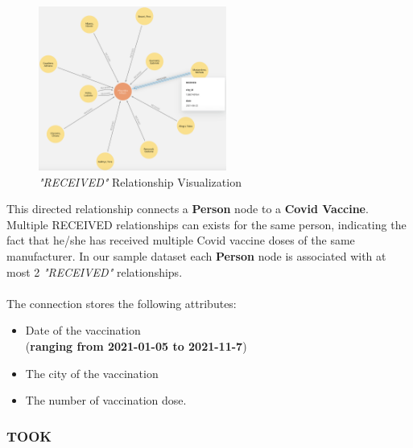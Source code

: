 \documentclass{article}[IEEEtran]
\begin{document}
\begin{figure}
\vspace{-1.5cm}
\begin{center}
\includegraphics[width=0.55\textwidth, frame]{RECEIVED.png}
\caption{\emph{"RECEIVED"} Relationship Visualization}
\end{center}
\end{figure}
This directed relationship connects a \textbf{Person} node to a \textbf{Covid Vaccine}. Multiple RECEIVED relationships  can exists for the same person, indicating the fact that he/she has received multiple Covid vaccine doses of the same manufacturer. In our sample dataset each \textbf{Person} node is associated with  at most 2 \emph{"RECEIVED"} relationships.
\\\\
The connection stores the following attributes:
\begin{itemize}
    \item Date of the vaccination \\ (\textbf{ranging from 2021-01-05 to 2021-11-7})
    \item The city of the vaccination
    \item The number of vaccination dose.
\end{itemize}

\vspace{2cm}


\subsubsection{TOOK}
\end{document}
